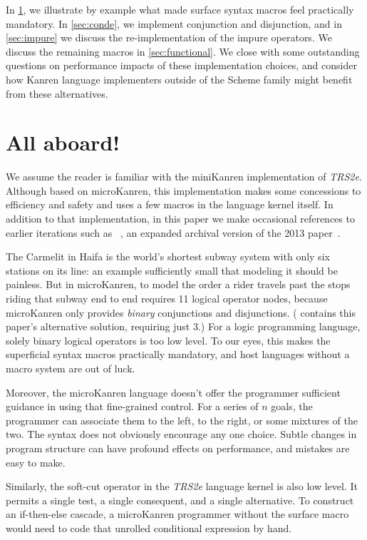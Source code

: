 \documentclass[sigplan,balance,pbalance,natbib=false]{acmart}
\begin{document}
In \cref{sec:all-aboard}, we illustrate by example what made surface
syntax macros feel practically mandatory. In \cref{sec:conde}, we
implement conjunction and disjunction, and in \cref{sec:impure} we
discuss the re-implementation of the impure operators. We discuss the
remaining macros in \cref{sec:functional}. We close with some
outstanding questions on performance impacts of these implementation
choices, and consider how Kanren language implementers outside of the
Scheme family might benefit from these alternatives.

\section{All aboard!}\label{sec:all-aboard}

We assume the reader is familiar with the miniKanren implementation of
\emph{TRS2e}. Although based on microKanren, this implementation makes
some concessions to efficiency and safety and uses a few macros in the
language kernel itself. In addition to that implementation, in this
paper we make occasional references to earlier iterations such as
\citeauthor{hemann2016small}~\cite{hemann2016small}, an expanded
archival version of the 2013 paper~\cite{hemann2013muKanren}.

The Carmelit in Haifa is the world's shortest subway system with only
six stations on its line: an example sufficiently small that modeling
it should be painless. But in microKanren, to model the order a rider
travels past the stops riding that subway end to end requires 11
logical operator nodes, because microKanren only provides
\emph{binary} conjunctions and disjunctions. (
contains this paper's alternative solution, requiring just 3.) For a
logic programming language, solely binary logical operators is too low
level. To our eyes, this makes the superficial syntax macros
practically mandatory, and host languages without a macro system are
out of luck.

Moreover, the microKanren language doesn't offer the programmer
sufficient guidance in using that fine-grained control. For a series
of $n$ goals, the programmer can associate them to the left, to the
right, or some mixtures of the two. The syntax does not obviously
encourage any one choice. Subtle changes in program structure can have
profound effects on performance, and mistakes are easy to make.

Similarly, the soft-cut operator  in the \emph{TRS2e}
language kernel is also low level. It permits a single test, a single
consequent, and a single alternative. To construct an if-then-else
cascade, a microKanren programmer without the 
surface macro would need to code that unrolled conditional expression
by hand.
\end{document}
